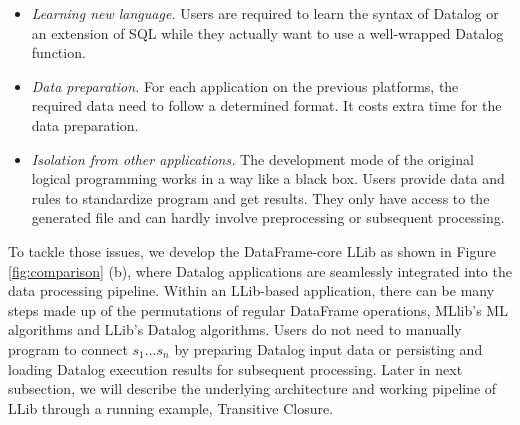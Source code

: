 \begin{itemize}
	\item \textit{Learning new language.} Users are required to learn the syntax of Datalog or an extension of SQL while they actually  want to use a well-wrapped Datalog function.
	\item \textit{Data preparation.} For each application on the previous platforms, the required data need to follow a determined format. It costs extra time for the data preparation.
	\item \textit {Isolation from other applications.} The development mode  of the original logical programming works in a way like a black box. Users provide data and rules to standardize program and get results. They only have access to the generated file and can hardly involve  preprocessing or subsequent processing.  
\end{itemize}

To tackle those issues, we develop the DataFrame-core LLib as shown in Figure \ref{fig:comparison} (b), where Datalog applications are seamlessly integrated into the data processing pipeline. Within an LLib-based application, there can be many steps made up of the permutations of regular DataFrame operations,  MLlib's ML algorithms and LLib's Datalog algorithms. Users do not need to manually program to connect $s_1$...$ s_n$ by preparing Datalog input data or persisting and loading Datalog execution results for subsequent processing.  Later in next subsection, we will describe the underlying architecture and working pipeline of LLib through a running example, Transitive Closure. 

